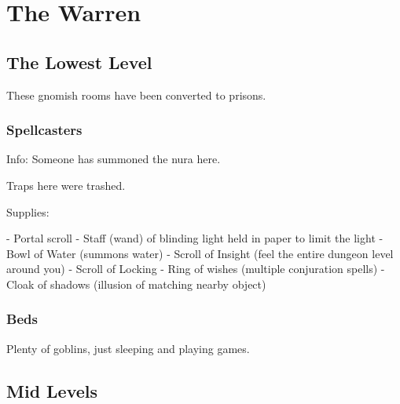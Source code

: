 \chapter{The Warren}

\section{The Lowest Level}

\begin{multicols}{2}
\setcounter{list}{0}


These gnomish rooms have been converted to prisons.

\subsection{Spellcasters}

Info: Someone has summoned the nura here.

Traps here were trashed.

Supplies:

- Portal scroll
- Staff (wand) of blinding light held in paper to limit the light
- Bowl of Water (summons water)
- Scroll of Insight (feel the entire dungeon level around you)
- Scroll of Locking
- Ring of wishes (multiple conjuration spells)
- Cloak of shadows (illusion of matching nearby object)

\goblinnuramancer

\goblin

\subsection{Beds}

Plenty of goblins, just sleeping and playing games.

\goblin

\end{multicols}

\section{Mid Levels}

